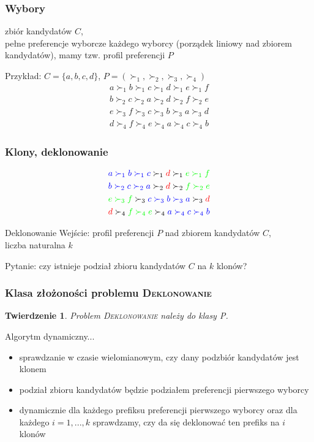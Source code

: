 \documentclass{beamer}
\newtheorem{tw}{Twierdzenie}
\begin{document}
\begin{frame} \frametitle{Wybory}
  zbiór kandydatów $C$, \\ 
  pełne preferencje wyborcze każdego wyborcy (porządek liniowy nad zbiorem kandydatów), mamy tzw. profil preferencji $P$

	\vfill

	Przykład: $C = \{a, b, c, d\}$, $P = (\succ_1, \succ_2, \succ_3, \succ_4)$
   	\begin{align*}
		a \succ_1 b \succ_1 c \succ_1 d \succ_1 e \succ_1 f \\
		b \succ_2 c \succ_2 a \succ_2 d \succ_2 f \succ_2 e \\
		e \succ_3 f \succ_3 c \succ_3 b \succ_3 a \succ_3 d \\
		d \succ_4 f \succ_4 e \succ_4 a \succ_4 c \succ_4 b
	\end{align*}
\end{frame}

\begin{frame} \frametitle{Klony, deklonowanie}
	\begin{align*}
		\textcolor{blue}{a \succ_1 b \succ_1 c} \succ_1 \textcolor{red}{d} \succ_1 \textcolor{green}{e \succ_1 f} \\
		\textcolor{blue}{b \succ_2 c \succ_2 a} \succ_2 \textcolor{red}{d} \succ_2 \textcolor{green}{f \succ_2 e} \\
		\textcolor{green}{e \succ_3 f} \succ_3 \textcolor{blue}{c \succ_3 b \succ_3 a} \succ_3 \textcolor{red}{d} \\
		\textcolor{red}{d} \succ_4 \textcolor{green}{f \succ_4 e} \succ_4 \textcolor{blue}{a \succ_4 c \succ_4 b}
	\end{align*}
	
	\begin{aproblem}{Deklonowanie}
    Wejście: profil preferencji $P$ nad zbiorem kandydatów $C$,\\
    	liczba naturalna $k$

    Pytanie: czy istnieje podział zbioru kandydatów $C$ na $k$ klonów?
  \end{aproblem}
\end{frame}

\begin{frame} \frametitle{Klasa złożoności problemu \textsc{Deklonowanie}}
	\begin{tw}
		Problem \textsc{Deklonowanie} należy do klasy P.
	\end{tw}
	\vfill
	Algorytm dynamiczny...
	\begin{itemize}
		\item sprawdzanie w czasie wielomianowym, czy dany podzbiór kandydatów jest klonem
		\item podział zbioru kandydatów będzie podziałem preferencji pierwszego wyborcy
		\item dynamicznie dla każdego prefiksu preferencji pierwszego wyborcy
			oraz dla każdego $i=1,...,k$ sprawdzamy, czy da się deklonować ten prefiks na $i$ klonów
	\end{itemize}
\end{frame} 
\end{document}
